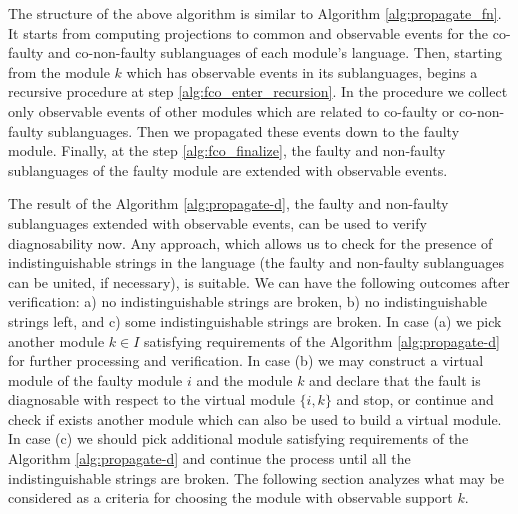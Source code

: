 \documentclass[a4paper, 10pt, conference]{ieeeconf}
\begin{document}
The structure of the above algorithm is similar to Algorithm
\ref{alg:propagate_fn}. It starts from computing projections to common and
observable events for the co-faulty and co-non-faulty sublanguages of each
module's language. Then, starting from the module $k$ which has observable
events in its sublanguages, begins a recursive procedure at step
\ref{alg:fco_enter_recursion}. In the procedure we collect only observable
events of other modules which are related to co-faulty or co-non-faulty
sublanguages. Then we propagated these events down to the faulty module.
Finally, at the step \ref{alg:fco_finalize}, the faulty and non-faulty
sublanguages of the faulty module are extended with observable events.

The result of the Algorithm \ref{alg:propagate-d}, the faulty and non-faulty
sublanguages extended with observable events, can be used to verify
diagnosability now. Any approach, which allows us to check for the presence of
indistinguishable strings in the language (the faulty and non-faulty
sublanguages can be united, if necessary), is suitable. We can have the
following outcomes after verification: a) no indistinguishable strings are
broken, b) no indistinguishable strings left, and c) some indistinguishable
strings are broken. In case (a) we pick another module $k \in I$ satisfying
requirements of the Algorithm \ref{alg:propagate-d} for further processing and
verification. In case (b) we may construct a virtual module of the faulty module
$i$ and the module $k$ and declare that the fault is diagnosable with respect to
the virtual module $\{i, k\}$ and stop, or continue and check if exists another
module which can also be used to build a virtual module. In case (c) we should
pick additional module satisfying requirements of the Algorithm
\ref{alg:propagate-d} and continue the process until all the indistinguishable
strings are broken. The following section analyzes what may be considered as a
criteria for choosing the module with observable support $k$.
\end{document}
